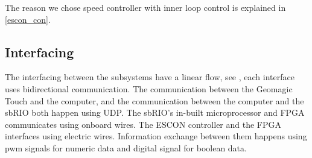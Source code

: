 The reason we chose speed controller with inner loop control is explained in \ref{escon_con}.

\subsection{Interfacing}

The interfacing between the subsystems have a linear flow, see , each interface uses bidirectional communication. The communication between the Geomagic Touch and the computer, and the communication between the computer and the sbRIO both happen using UDP. The sbRIO's in-built microprocessor and FPGA communicates using onboard wires. The ESCON controller and the FPGA interfaces using electric wires. Information exchange between them happens using pwm signals for numeric data and digital signal for boolean data.




